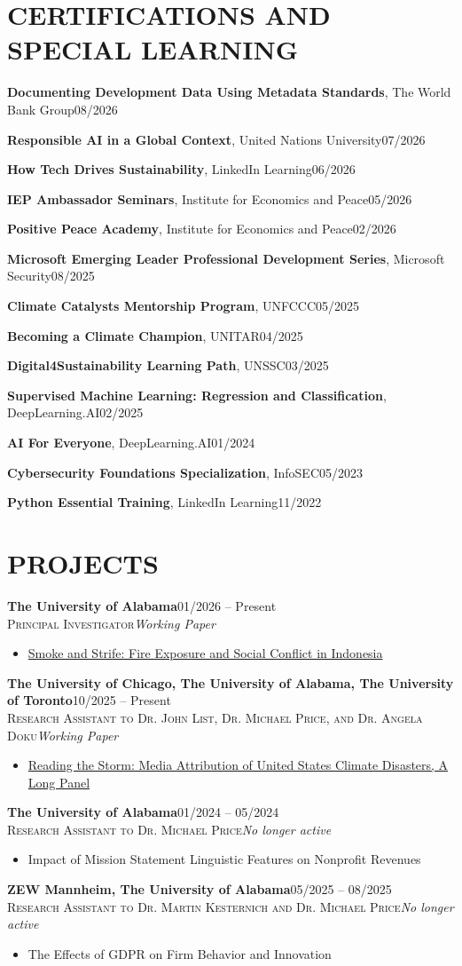 \documentclass[a4paper,9pt]{extarticle}
\newcommand{\empitem}[2]{\noindent#1\hfill#2\par\vspace{2pt}}
\newcommand{\projitem}[5]{%
  \noindent\textbf{#1}\hfill#4\\[1pt]
  \textsc{#2}\hfill\textit{#5}
  \begin{itemize}[leftmargin=1.5em, topsep=4pt, partopsep=0pt, itemsep=0pt]
    \item #3
  \end{itemize}
  \vspace{6pt}
}
\begin{document}
\section*{CERTIFICATIONS AND SPECIAL LEARNING}
\empitem{\textbf{Documenting Development Data Using Metadata Standards}, The World Bank Group}{08/2026}
\empitem{\textbf{Responsible AI in a Global Context}, United Nations University}{07/2026}
\empitem{\textbf{How Tech Drives Sustainability}, LinkedIn Learning}{06/2026}
\empitem{\textbf{IEP Ambassador Seminars}, Institute for Economics and Peace}{05/2026}
\empitem{\textbf{Positive Peace Academy}, Institute for Economics and Peace}{02/2026}
\empitem{\textbf{Microsoft Emerging Leader Professional Development Series}, Microsoft Security}{08/2025}
\empitem{\textbf{Climate Catalysts Mentorship Program}, UNFCCC}{05/2025}
\empitem{\textbf{Becoming a Climate Champion}, UNITAR}{04/2025}
\empitem{\textbf{Digital4Sustainability Learning Path}, UNSSC}{03/2025}
\empitem{\textbf{Supervised Machine Learning: Regression and Classification}, DeepLearning.AI}{02/2025}
\empitem{\textbf{AI For Everyone}, DeepLearning.AI}{01/2024}
\empitem{\textbf{Cybersecurity Foundations Specialization}, InfoSEC}{05/2023}
\empitem{\textbf{Python Essential Training}, LinkedIn Learning}{11/2022}


\section*{PROJECTS}

\projitem{The University of Alabama}
  {Principal Investigator}
  {\href{https://github.com/Hariaksha/smoke-and-strife/blob/main/paper/main.pdf}{Smoke and Strife: Fire Exposure and Social Conflict in Indonesia}}
  {01/2026 -- Present}
  {Working Paper}

\projitem{The University of Chicago, The University of Alabama, The University of Toronto}
  {Research Assistant to Dr. John List, Dr. Michael Price, and Dr. Angela Doku}
  {\href{https://github.com/Hariaksha/reading-the-storm/blob/main/paper/main.pdf}{Reading the Storm: Media Attribution of United States Climate Disasters, A Long Panel}}
  {10/2025 -- Present}
  {Working Paper}

\projitem{The University of Alabama}
  {Research Assistant to Dr. Michael Price}
  {Impact of Mission Statement Linguistic Features on Nonprofit Revenues}
  {01/2024 -- 05/2024}
  {No longer active}

\projitem{ZEW Mannheim, The University of Alabama}
  {Research Assistant to Dr. Martin Kesternich and Dr. Michael Price}
  {The Effects of GDPR on Firm Behavior and Innovation}
  {05/2025 -- 08/2025}
  {No longer active}
\end{document}
